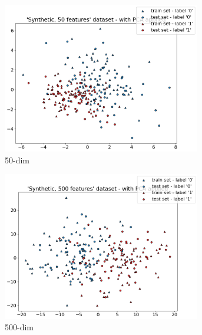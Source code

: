 \begin{figure}[h]
    \centering
    \begin{subfigure}[t]{0.32\textwidth}
        \centering
        \includegraphics[width=0.95\textwidth]{figures/'Synthetic, 50 features' dataset - with PCA applied.png}
        \caption{50-dim}
    \end{subfigure}
    \begin{subfigure}[t]{0.32\textwidth}
        \centering
        \includegraphics[width=0.95\textwidth]{figures/'Synthetic, 500 features' dataset - with PCA applied.png}
        \caption{500-dim}
    \end{subfigure}
    \begin{subfigure}[t]{0.32\textwidth}
        \centering

\end{subfigure}
\end{figure}
